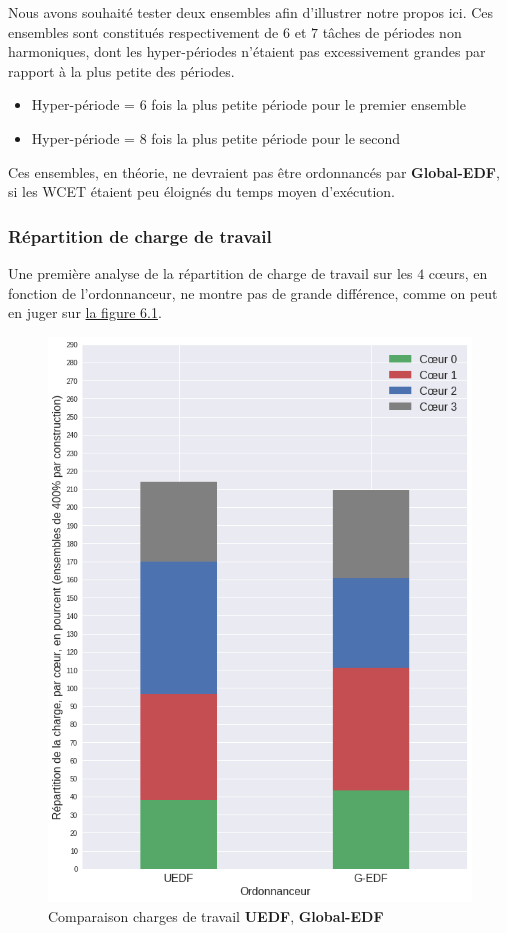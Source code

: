 	Nous avons souhaité tester deux ensembles afin d'illustrer notre propos ici. Ces ensembles sont
	 constitués respectivement de $6$ et $7$ tâches de périodes 
	non harmoniques, dont les hyper-périodes n'étaient pas excessivement grandes par rapport à la plus petite des périodes.
	\begin{itemize}
		\item Hyper-période = $6$ fois la plus petite période pour le premier ensemble
		\item Hyper-période = $8$ fois la plus petite période pour le second
	\end{itemize}
	Ces ensembles, en théorie, ne devraient pas être ordonnancés par \textbf{Global-EDF}, si les WCET étaient peu éloignés du temps 
	moyen d'exécution.\newline
	
	\subsubsection{Répartition de charge de travail}
	Une première analyse de la répartition de charge de travail sur les $4$ cœurs, en fonction de l'ordonnanceur, 
	ne montre pas de grande différence, comme on peut en juger sur \hyperref[3tasksmigrations]{la figure 6.1}.
	
	\begin{figure}[H]
		\label{3tasksmigrations}
		\caption{Comparaison charges de travail \textbf{UEDF}, \textbf{Global-EDF}}
		\includegraphics[scale=0.6]{img/wcet/repartitiondecharges_migrations.png}
	\end{figure}
	
